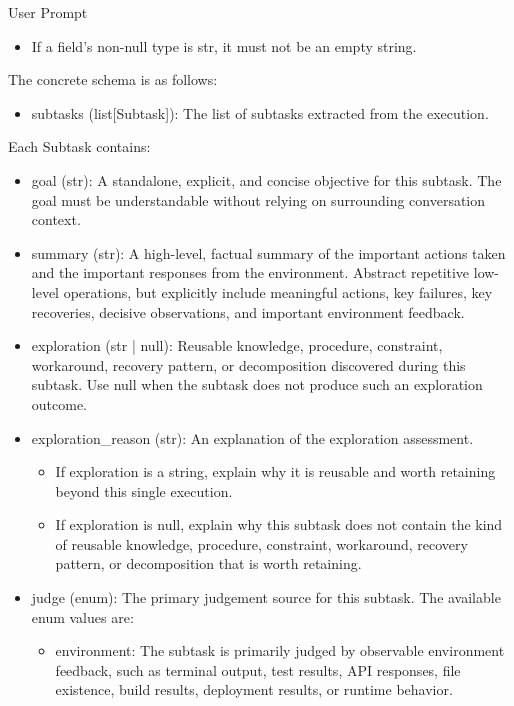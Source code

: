 \documentclass{llmxive}
\providecommand{\svinlinecode}[1]{{\ttfamily #1}}
\begin{document}
\begin{svpromptbox}{User Prompt}
\begin{itemize}
\item If a field's non-null type is \svinlinecode{str}, it must not be an empty string.
\end{itemize}
\smallskip
The concrete schema is as follows:\par
\smallskip
\begin{itemize}
\item \svinlinecode{subtasks} (\svinlinecode{list[Subtask]}): The list of subtasks extracted from the execution.
\end{itemize}
\smallskip
Each \svinlinecode{Subtask} contains:\par
\smallskip
\begin{itemize}
\item \svinlinecode{goal} (\svinlinecode{str}): A standalone, explicit, and concise objective for this subtask. The goal must be understandable without relying on surrounding conversation context.
\item \svinlinecode{summary} (\svinlinecode{str}): A high-level, factual summary of the important actions taken and the important responses from the environment. Abstract repetitive low-level operations, but explicitly include meaningful actions, key failures, key recoveries, decisive observations, and important environment feedback.
\item \svinlinecode{exploration} (\svinlinecode{str | null}): Reusable knowledge, procedure, constraint, workaround, recovery pattern, or decomposition discovered during this subtask. Use \svinlinecode{null} when the subtask does not produce such an exploration outcome.
\item \svinlinecode{exploration\_reason} (\svinlinecode{str}): An explanation of the exploration assessment.
\begin{itemize}
\item If \svinlinecode{exploration} is a string, explain why it is reusable and worth retaining beyond this single execution.
\item If \svinlinecode{exploration} is \svinlinecode{null}, explain why this subtask does not contain the kind of reusable knowledge, procedure, constraint, workaround, recovery pattern, or decomposition that is worth retaining.
\end{itemize}
\item \svinlinecode{judge} (\svinlinecode{enum}): The primary judgement source for this subtask. The available enum values are:
\begin{itemize}
\item \svinlinecode{environment}: The subtask is primarily judged by observable environment feedback, such as terminal output, test results, API responses, file existence, build results, deployment results, or runtime behavior.

\end{itemize}
\end{itemize}
\end{svpromptbox}
\end{document}
